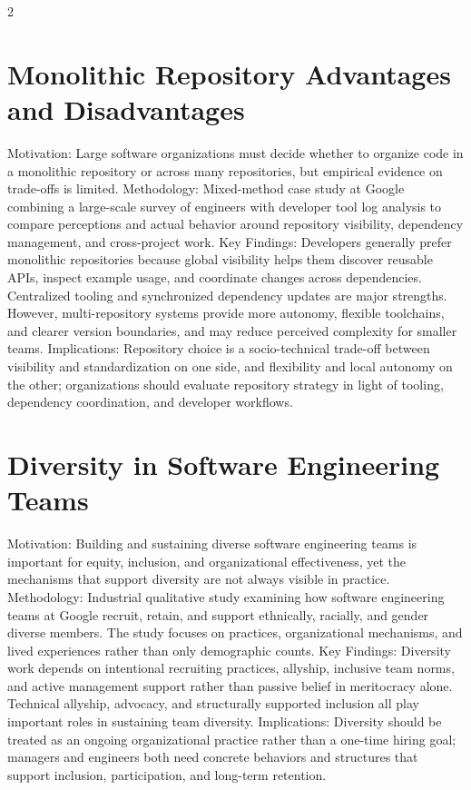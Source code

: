 \documentclass[8pt,a4paper]{extarticle}
\begin{document}
\begin{multicols*}{2}
    \section{Monolithic Repository Advantages and Disadvantages}
    Motivation: Large software organizations must decide whether to organize code in a monolithic repository or across many repositories, but empirical evidence on trade-offs is limited. Methodology: Mixed-method case study at Google combining a large-scale survey of engineers with developer tool log analysis to compare perceptions and actual behavior around repository visibility, dependency management, and cross-project work. Key Findings: Developers generally prefer monolithic repositories because global visibility helps them discover reusable APIs, inspect example usage, and coordinate changes across dependencies. Centralized tooling and synchronized dependency updates are major strengths. However, multi-repository systems provide more autonomy, flexible toolchains, and clearer version boundaries, and may reduce perceived complexity for smaller teams. Implications: Repository choice is a socio-technical trade-off between visibility and standardization on one side, and flexibility and local autonomy on the other; organizations should evaluate repository strategy in light of tooling, dependency coordination, and developer workflows.

    \section{Diversity in Software Engineering Teams}
    Motivation: Building and sustaining diverse software engineering teams is important for equity, inclusion, and organizational effectiveness, yet the mechanisms that support diversity are not always visible in practice. Methodology: Industrial qualitative study examining how software engineering teams at Google recruit, retain, and support ethnically, racially, and gender diverse members. The study focuses on practices, organizational mechanisms, and lived experiences rather than only demographic counts. Key Findings: Diversity work depends on intentional recruiting practices, allyship, inclusive team norms, and active management support rather than passive belief in meritocracy alone. Technical allyship, advocacy, and structurally supported inclusion all play important roles in sustaining team diversity. Implications: Diversity should be treated as an ongoing organizational practice rather than a one-time hiring goal; managers and engineers both need concrete behaviors and structures that support inclusion, participation, and long-term retention.


\end{multicols*}
\end{document}
